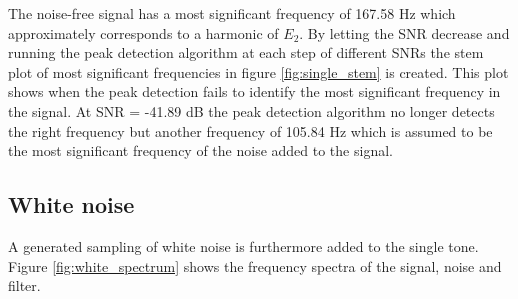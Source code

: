 The noise-free signal has a most significant frequency of 167.58 Hz which approximately corresponds to a harmonic of $E_2$. By letting the SNR decrease and running the peak detection algorithm at each step of different SNRs the stem plot of most significant frequencies in figure \ref{fig:single_stem} is created. This plot shows when the peak detection fails to identify the most significant frequency in the signal. At SNR = -41.89 dB the peak detection algorithm no longer detects the right frequency but another frequency of 105.84 Hz which is assumed to be the most significant frequency of the noise added to the signal.

\subsection{White noise}
A generated sampling of white noise is furthermore added to the single tone. Figure \ref{fig:white_spectrum} shows the frequency spectra of the signal, noise and filter.

